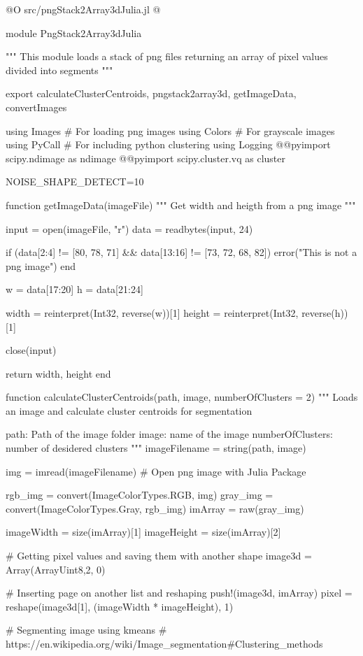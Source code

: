 \documentclass[11pt,oneside]{article}	%
\begin{document}
@O src/pngStack2Array3dJulia.jl
@{module PngStack2Array3dJulia

"""
This module loads a stack of png files returning
an array of pixel values divided into segments
"""

export calculateClusterCentroids, pngstack2array3d, getImageData, convertImages

using Images # For loading png images
using Colors # For grayscale images
using PyCall # For including python clustering
using Logging
@@pyimport scipy.ndimage as ndimage
@@pyimport scipy.cluster.vq as cluster

NOISE_SHAPE_DETECT=10

function getImageData(imageFile)
  """
  Get width and heigth from a png image
  """

  input = open(imageFile, "r")
  data = readbytes(input, 24)

  if (data[2:4] != [80, 78, 71] && data[13:16] != [73, 72, 68, 82])
    error("This is not a png image")
  end

  w = data[17:20]
  h = data[21:24]

  width = reinterpret(Int32, reverse(w))[1]
  height = reinterpret(Int32, reverse(h))[1]

  close(input)

  return width, height
end

function calculateClusterCentroids(path, image, numberOfClusters = 2)
  """
  Loads an image and calculate cluster centroids for segmentation

  path: Path of the image folder
  image: name of the image
  numberOfClusters: number of desidered clusters
  """
  imageFilename = string(path, image)

  img = imread(imageFilename) # Open png image with Julia Package

  rgb_img = convert(Image{ColorTypes.RGB}, img)
  gray_img = convert(Image{ColorTypes.Gray}, rgb_img)
  imArray = raw(gray_img)

  imageWidth = size(imArray)[1]
  imageHeight = size(imArray)[2]

  # Getting pixel values and saving them with another shape
  image3d = Array(Array{Uint8,2}, 0)

  # Inserting page on another list and reshaping
  push!(image3d, imArray)
  pixel = reshape(image3d[1], (imageWidth * imageHeight), 1)

  # Segmenting image using kmeans
  # https://en.wikipedia.org/wiki/Image_segmentation#Clustering_methods

}
\end{document}
